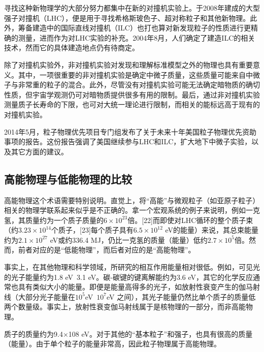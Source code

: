 寻找这种新物理学的大部分努力都集中在新的对撞机实验上。于2008年建成的大型强子对撞机（LHC），便是用于寻找希格斯玻色子、超对称粒子和其他新物理。此外，筹备建造中的国际直线对撞机（ILC）也打也算对新发现粒子的性质进行更精确的测量，进而作为对LHC实验的补充。2004年8月，人们确定了建造ILC的相关技术，然而它的具体建造地点仍有待商定。

除了对撞机实验外，非对撞机实验对发现和理解标准模型之外的物理也具有重要意义。其中，一项很重要的非对撞机实验是确定中微子质量，这些质量可能来自中微子与非常重的粒子的混合。此外，尽管没有对撞机实验可能无法确定暗物质的确切性质，但宇宙学观测仍可对暗物质提供很多有用的限制。最后，通过非对撞机实验测量质子长寿命的下限，也可对大统一理论进行限制，而相关的能标远高于现有的对撞机实验。

2014年5月，粒子物理优先项目专门组发布了关于未来十年美国粒子物理优先资助事项的报告。这份报告强调了美国继续参与LHC和ILC，扩大地下中微子实验，以及其它方面的建议。

\subsection{高能物理与低能物理的比较}
高能物理这个术语需要特别说明。直觉上，将“高能”与微观粒子（如亚原子粒子）相关的物理学联系起来似乎是不正确的。拿一个宏观系统的例子来说明，例如一克氢，其质量约为一个质子质量的$6\times10^{23}$倍。[22]而即使对LHC循环的整个质子束（约$3.23\times10^{14}$个质子，[23]每个质子具有$6.5\times10^{12}$ eV的能量）来说，其总束能量约为$2.1\times10^{27}$ eV或约336.4 MJ，仍比一克氢的质量（能量）低约$2.7\times10^{5}$倍。然而，前者对应的是“低能物理”，而后者对应的是“高能物理”。

事实上，在其他物理和科学领域，所研究的相互作用能量相对很低。例如，可见光的光子能量约为1.8 eV~3.1 eV。碳-碳键的键离解能约为3.6 eV，其它的化学反应通常也具有类似大小的能量。即便是能量高得多的光子，如放射性衰变产生的伽马射线（大部分光子能量在$10^{5} $eV~$10^{7}$eV 之间），其光子能量仍然比单个质子的质量低两个数量级。事实上，放射性衰变伽马射线属于是核物理的一部分，而非高能物理。

质子的质量约为9.4×108 eV。对于其他的“基本粒子”和强子，也具有很高的质量（能量）。由于单个粒子的能量非常高，因此粒子物理属于高能物理。